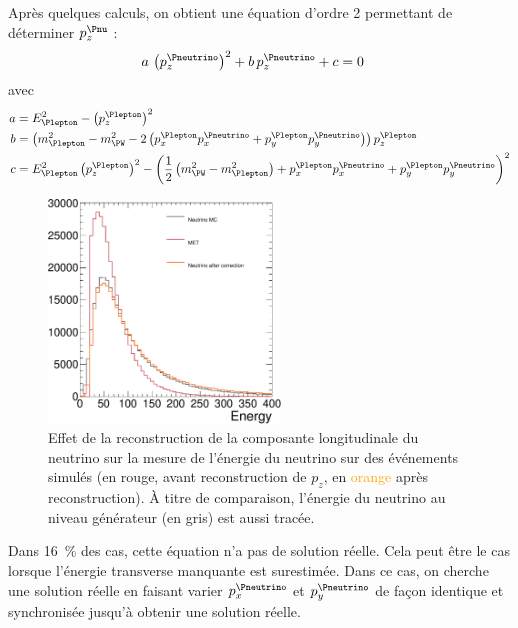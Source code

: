 Après quelques calculs, on obtient une équation d'ordre 2 permettant de déterminer $p_z^{\Pnu}$ :
\begin{align*}
  a \, \left( p_z^{{\Pneutrino}} \right)^2 + b \, p_z^{{\Pneutrino}} + c &= 0
\end{align*}
avec
\begin{align*}
  a &= E_{\Plepton}^2 - \left( p_z^{{\Plepton}} \right)^2 \\
  b &= \left( m_{\Plepton}^2 - m_{\PW}^2 - 2 \left( p_x^{\Plepton} p_x^{\Pneutrino} + p_y^{\Plepton} p_y^{\Pneutrino} \right) \right) p_z^{\Plepton} \\
  c &= E_{\Plepton}^2 \left( p_z^{\Plepton} \right)^2 - \left( \frac{1}{2} \left( m_{\PW}^2 - m_{\Plepton}^2 \right) + p_x^{\Plepton} p_x^{\Pneutrino} + p_y^{\Plepton} p_y^{\Pneutrino} \right)^2
\end{align*}

\begin{figure}[tbp]
    \centering
    \includegraphics[width=0.55\textwidth]{chapitre6/figs/neutrino_energy/plot_met_energy.pdf}
    \caption{Effet de la reconstruction de la composante longitudinale du neutrino sur la mesure de l'énergie du neutrino sur des événements \ttbar simulés (en \textcolor{rouge_grandmere}{rouge}, avant reconstruction de $p_z$, en \textcolor{orange}{orange} après reconstruction). À titre de comparaison, l'énergie du neutrino au niveau générateur (en \textcolor{bleu_gris}{gris}) est aussi tracée.}
    \label{fig:neutrino_correction}
\end{figure}

Dans \tilde\SI{16}{\%} des cas, cette équation n'a pas de solution réelle. Cela peut être le cas lorsque l'énergie transverse manquante est surestimée. Dans ce cas, on cherche une solution réelle en faisant varier $p_x^{\Pneutrino}$ et $p_y^{\Pneutrino}$ de façon identique et synchronisée jusqu'à obtenir une solution réelle.

